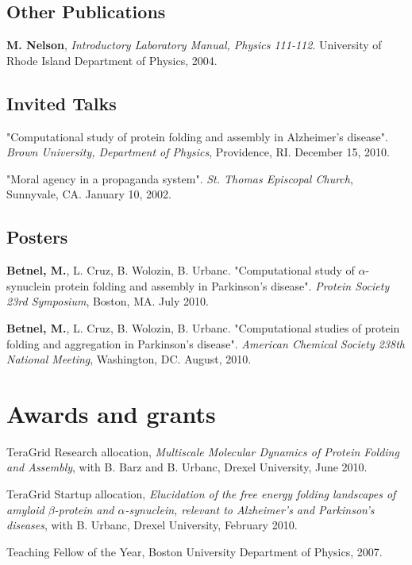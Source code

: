 \documentclass[letterpaper]{article}
\renewenvironment{itemize}{
  \begin{list}{}{
    \setlength{\leftmargin}{1.5em}
  }
}{
  \end{list}
}
\begin{document}
\subsection*{Other Publications}
\begin{itemize}
	\item \textbf{M. Nelson}, \emph{Introductory Laboratory Manual, Physics 111-112}.  University of Rhode Island Department of Physics,  2004.
\end{itemize}

\subsection*{Invited Talks}
\begin{itemize}
	\item  "Computational study of protein folding and assembly in
          Alzheimer's disease". \emph{Brown University, Department of
            Physics}, Providence, RI. December 15, 2010.
          \item  "Moral agency in a propaganda system". \emph{St. Thomas Episcopal Church}, Sunnyvale,
            CA. January 10, 2002.
\end{itemize}



\subsection*{Posters}
\begin{itemize}
	\item \textbf{Betnel, M.}, L. Cruz, B. Wolozin, B. Urbanc.  
	"Computational study of $\alpha$-synuclein protein folding and assembly in Parkinson's disease". \emph{Protein Society 23rd Symposium}, Boston, MA.  July 2010.
	\item \textbf{Betnel, M.}, L. Cruz, B. Wolozin, B. Urbanc.  
	"Computational studies of protein folding and aggregation in Parkinson's 
	disease". \emph{American Chemical Society 238th National Meeting}, Washington, DC.  August, 2010.
\end{itemize}

\section*{Awards and grants}
\begin{itemize}
	\item TeraGrid Research allocation, \emph{Multiscale Molecular Dynamics of Protein
	 Folding and Assembly}, with B. Barz and B. Urbanc, Drexel University, 
	June 2010.
    \item TeraGrid Startup allocation, \emph{Elucidation of the free energy folding 
landscapes of amyloid $\beta$-protein and $\alpha$-synuclein, relevant to 
Alzheimer's and Parkinson's diseases}, with B. Urbanc, Drexel University, 
February 2010.  
	\item Teaching Fellow of the Year, Boston University Department of Physics, 2007.

\end{itemize}
\end{document}
